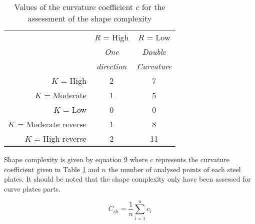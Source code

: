 \begin{table}
\caption{Values of the curvature coefficient $c$ for the assessment of the shape complexity}
\label{tab:compshape}
\begin{center}
\begin{tabular}{rcc}
           &   $R$ = High &    $R$ = Low \\
 &  {\it One} & {\it Double} \\
 & {\it direction} & {\it Curvature} \\
  $K$ = High &          2 &          7 \\
$K$ = Moderate &          1 &          5 \\
   $K$ = Low &          0 &          0 \\
$K$ = Moderate reverse &          1 &          8 \\
$K$ = High reverse &          2 &         11 \\
\end{tabular}
\end{center}
\end{table}


Shape complexity is given by equation 9 where $c$ represents the curvature coefficient given in Table \ref{tab:compshape} and $n$ the number of analysed points of each steel plates. It should be noted that the shape complexity only have been assessed for curve plates parts.


\begin{equation}
C_{sh} = \frac{1}{n} \sum_{i=1}^{n} c_i
\end{equation}